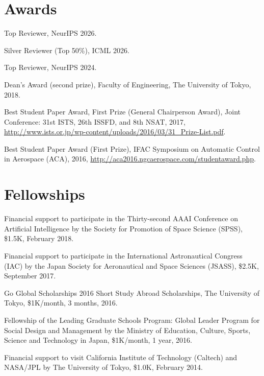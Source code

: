 \section{Awards}
\begin{description}[leftmargin=*,style=nextline]

\item Top Reviewer, NeurIPS 2026.

\item Silver Reviewer (Top 50\%), ICML 2026.

\item Top Reviewer, NeurIPS 2024.

\item Dean's Award (second prize), Faculty of Engineering, The University of Tokyo, 2018.

\item Best Student Paper Award, First Prize (General Chairperson Award), Joint Conference: 31st ISTS, 26th ISSFD, and 8th NSAT, 2017, 
\url{http://www.ists.or.jp/wp-content/uploads/2016/03/31_Prize-List.pdf}.

\item Best Student Paper Award (First Prize), IFAC Symposium on Automatic Control in Aerospace (ACA), 2016, 
\url{http://aca2016.ngcaerospace.com/studentaward.php}.
\end{description}


\section{Fellowships}
\begin{description}[leftmargin=*,style=nextline]
\item Financial support to participate in the Thirty-second AAAI Conference on Artificial Intelligence by the Society for Promotion of Space Science (SPSS), \$1.5K, February 2018.
\item Financial support to participate in the International Astronautical Congress (IAC) by the Japan Society for Aeronautical and Space Sciences (JSASS), \$2.5K, September 2017.
\item Go Global Scholarships 2016 Short Study Abroad Scholarships, The University of Tokyo, \$1K/month, 3 months, 2016.
\item Fellowship of the Leading Graduate Schools Program: Global Leader Program for Social Design and Management by the Ministry of Education, Culture, Sports, Science and Technology in Japan, \$1K/month, 1 year, 2016.
\item Financial support to visit California Institute of Technology (Caltech) and NASA/JPL by The University of Tokyo, \$1.0K, February 2014.
\end{description}
